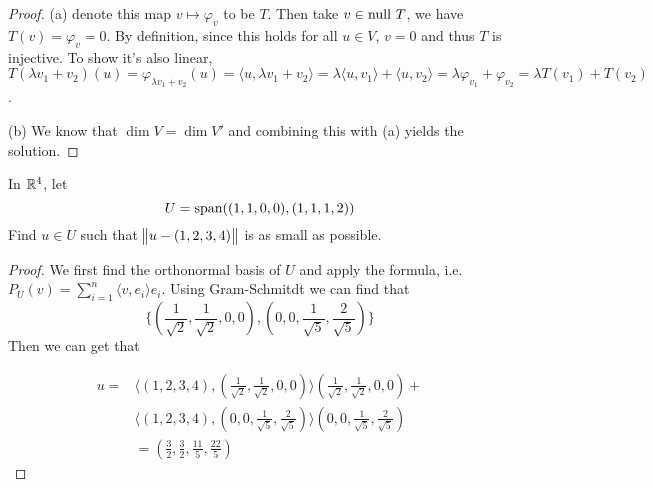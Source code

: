 \documentclass{extarticle}
\begin{document}
\begin{proof}
(a) denote this map \(v \mapsto \varphi_v\) to be \(T\). Then take \(v \in \text{null } T\), we have 
\(T(v) = \varphi_v = 0\). By definition, since this holds for all \(u \in V\), \(v = 0\) and thus 
\(T\) is injective. To show it's also linear, \(T (\lambda v_1 + v_2) (u)
= \varphi_{\lambda v_1 + v_2} (u) = \langle u, \lambda v_1 + v_2 \rangle = \lambda \langle u,v_1 \rangle 
+ \langle u,v_2 \rangle = \lambda \varphi_{v_1} + \varphi_{v_2} = \lambda T(v_1) + T(v_2) \). 

(b) We know that \(\dim V = \dim V'\) and combining this with (a) yields the solution.
\end{proof}


\begin{problem}{15}
    In \(\mathbb{R}^4\), let 
    \[U = \text{span}((1,1,0,0),(1,1,1,2))\]
    Find \(u \in U\) such that \(\norm{u - (1,2,3,4)}\) is as small as possible.
\end{problem}

\begin{proof}
We first find the orthonormal basis of \(U\) and apply the formula, i.e. \(P_U(v) = \sum_{i=1}^{n} 
\langle v,e_i \rangle e_i\). Using Gram-Schmitdt we can find that 
\[\{(\frac{1}{\sqrt{2}}, \frac{1}{\sqrt{2}}, 0, 0), (0, 0, \frac{1}{\sqrt{5}}, \frac{2}{\sqrt{5}})\}\]
Then we can get that 

\begin{align*}
    u = &\langle (1,2,3,4),(\frac{1}{\sqrt{2}}, \frac{1}{\sqrt{2}}, 0, 0) \rangle 
(\frac{1}{\sqrt{2}}, \frac{1}{\sqrt{2}}, 0, 0) +  \\ 
&\langle (1,2,3,4),(0, 0, \frac{1}{\sqrt{5}}, \frac{2}{\sqrt{5}}) \rangle 
(0, 0, \frac{1}{\sqrt{5}}, \frac{2}{\sqrt{5}}) \\ 
&= (\frac{3}{2}, \frac{3}{2}, \frac{11}{5}, \frac{22}{5})
\end{align*}
\end{proof}



\end{document}
